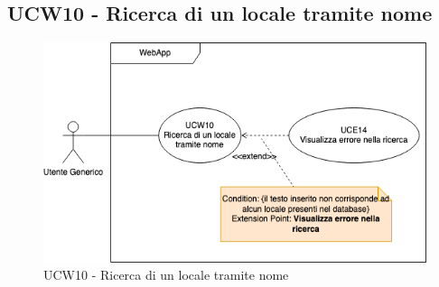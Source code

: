 \subsection{UCW10 - Ricerca di un locale tramite nome}
\begin{figure}[!h]
\centering
\includegraphics[scale=0.5]{UC_images/UCW10.png} 
\caption{UCW10 - Ricerca di un locale tramite nome}
\end{figure}
